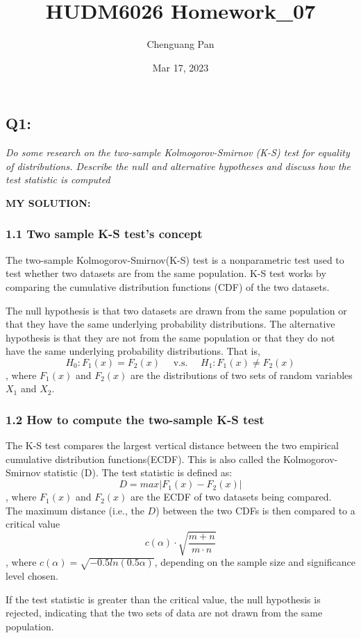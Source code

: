 \documentclass[
]{article}
\title{HUDM6026 Homework\_07}
\author{Chenguang Pan}
\date{Mar 17, 2023}
\begin{document}
\maketitle

\hypertarget{q1}{%
\subsection{Q1:}\label{q1}}

\emph{Do some research on the two-sample Kolmogorov-Smirnov (K-S) test
for equality of distributions. Describe the null and alternative
hypotheses and discuss how the test statistic is computed}

\textbf{MY SOLUTION:}

\hypertarget{two-sample-k-s-tests-concept}{%
\subsubsection{1.1 Two sample K-S test's
concept}\label{two-sample-k-s-tests-concept}}

The two-sample Kolmogorov-Smirnov(K-S) test is a nonparametric test used
to test whether two datasets are from the same population. K-S test
works by comparing the cumulative distribution functions (CDF) of the
two datasets.

The null hypothesis is that two datasets are drawn from the same
population or that they have the same underlying probability
distributions. The alternative hypothesis is that they are not from the
same population or that they do not have the same underlying probability
distributions. That is,
\[H_0: F_1(x)=F_2(x) \quad\text{ v.s. }\quad H_1: F_1(x)\neq F_2(x)\],
where \(F_1(x)\) and \(F_2(x)\) are the distributions of two sets of
random variables \(X_1\) and \(X_2\).

\hypertarget{how-to-compute-the-two-sample-k-s-test}{%
\subsubsection{1.2 How to compute the two-sample K-S
test}\label{how-to-compute-the-two-sample-k-s-test}}

The K-S test compares the largest vertical distance between the two
empirical cumulative distribution functions(ECDF). This is also called
the Kolmogorov-Smirnov statistic (D). The test statistic is defined as:
\[D=max|F_1(x)-F_2(x)|\], where \(F_1(x)\) and \(F_2(x)\) are the ECDF
of two datasets being compared.\\
The maximum distance (i.e., the \(D\)) between the two CDFs is then
compared to a critical value
\[c(\alpha)\cdot\sqrt{\frac{m+n}{m\cdot n}}\], where
\(c(\alpha)= \sqrt{-0.5ln(0.5\alpha)}\), depending on the sample size
and significance level chosen.

If the test statistic is greater than the critical value, the null
hypothesis is rejected, indicating that the two sets of data are not
drawn from the same population.
\end{document}
